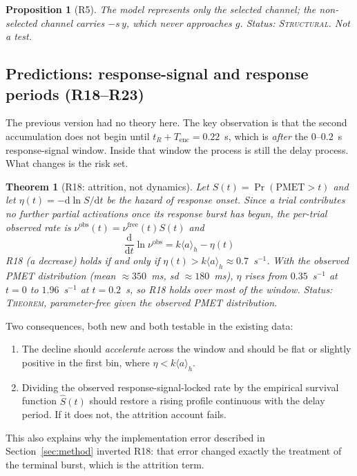 \documentclass[11pt,a4paper]{article}
\newcommand{\dd}{\mathrm{d}}
\theoremstyle{plain}
\newtheorem{proposition}{Proposition}
\newtheorem{theorem}{Theorem}
\theoremstyle{remark}
\begin{document}
\begin{proposition}[R5]
The model represents only the selected channel; the non-selected channel carries
$-s\,y$, which never approaches $g$. \emph{Status: \textsc{Structural}. Not a test.}
\end{proposition}

\subsection{Predictions: response-signal and response periods (R18--R23)}
\label{sec:response}

The previous version had no theory here. The key observation is that the second
accumulation does not begin until $t_R+T_{\text{enc}}=0.22$~s, which is \emph{after} the
$0$--$0.2$~s response-signal window. Inside that window the process is still the delay
process. What changes is the risk set.

\begin{theorem}[R18: attrition, not dynamics]
\label{thm:R18}
Let $S(t)=\Pr(\text{PMET}>t)$ and let $\eta(t)=-\dd\ln S/\dd t$ be the hazard of response
onset. Since a trial contributes no further partial activations once its response burst
has begun, the per-trial observed rate is $\nu^{\text{obs}}(t)=\nu^{\text{free}}(t)S(t)$
and
\begin{equation}
\boxed{\;\frac{\dd}{\dd t}\ln\nu^{\text{obs}}=k\langle a\rangle_h-\eta(t)\;}
\end{equation}
R18 (a decrease) holds if and only if $\eta(t)>k\langle a\rangle_h\approx0.7$~s$^{-1}$.
With the observed PMET distribution (mean $\approx350$~ms, sd $\approx180$~ms),
$\eta$ rises from $0.35$~s$^{-1}$ at $t=0$ to $1.96$~s$^{-1}$ at $t=0.2$~s, so R18 holds
over most of the window. \emph{Status: \textsc{Theorem}, parameter-free given the observed
PMET distribution.}
\end{theorem}

Two consequences, both new and both testable in the existing data:
\begin{enumerate}
\item The decline should \emph{accelerate} across the window and should be flat or slightly
positive in the first bin, where $\eta<k\langle a\rangle_h$.
\item Dividing the observed response-signal-locked rate by the empirical survival function
$\hat S(t)$ should restore a rising profile continuous with the delay period. If it does
not, the attrition account fails.
\end{enumerate}
This also explains why the implementation error described in Section~\ref{sec:method}
inverted R18: that error changed exactly the treatment of the terminal burst, which is the
attrition term.
\end{document}
